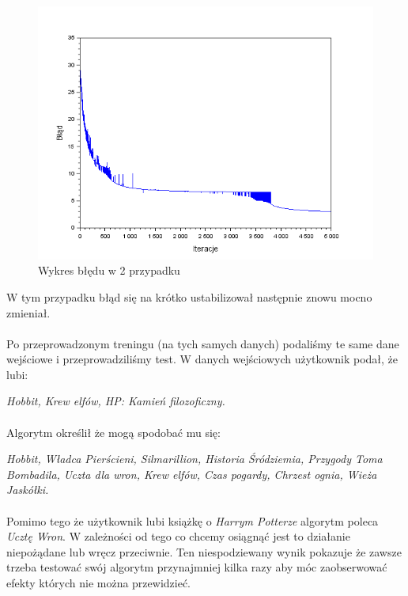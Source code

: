             \begin{figure}[H]
                \centering

                \includegraphics[width=\textwidth]{img/wykres_2.png}

                \caption{Wykres błędu w 2 przypadku}

                \label{rys:2}
            \end{figure}

            W tym przypadku błąd się na krótko ustabilizował następnie znowu mocno zmieniał.


        \paragraph{}
            Po przeprowadzonym treningu (na tych samych danych) podaliśmy te same dane wejściowe
            i przeprowadziliśmy test. W danych wejściowych użytkownik podał, że lubi:

            \textit{
                Hobbit, Krew elfów, HP: Kamień filozoficzny.
            }
        \paragraph{}
            Algorytm określił że mogą spodobać mu się:

            \textit{
                Hobbit,  Władca Pierścieni, Silmarillion,  Historia Śródziemia, Przygody Toma Bombadila,
                Uczta dla wron,  Krew elfów,  Czas pogardy,  Chrzest ognia,  Wieża Jaskółki.
            }

        \paragraph{}
            Pomimo tego że użytkownik lubi książkę o \textit{Harrym Potterze} algorytm poleca \textit{Ucztę Wron}.
            W zależności od tego co chcemy osiągnąć jest to działanie niepożądane lub wręcz przeciwnie.
            Ten niespodziewany wynik pokazuje że zawsze trzeba testować swój algorytm przynajmniej kilka
            razy aby móc zaobserwować efekty których nie można przewidzieć.
